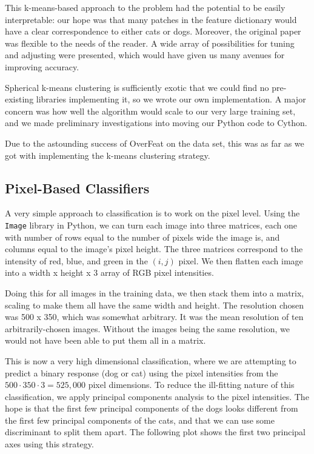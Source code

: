 \documentclass[12pt]{article}
\begin{document}
This k-means-based approach to the problem had the potential to be easily interpretable: our hope was that many patches in the feature dictionary would have a clear correspondence to either cats or dogs. Moreover, the original paper was flexible to the needs of the reader. A wide array of possibilities for tuning and adjusting were presented, which would have given us many avenues for improving accuracy.

Spherical k-means clustering is sufficiently exotic that we could find no pre-existing libraries implementing it, so we wrote our own implementation. A major concern was how well the algorithm would scale to our very large training set, and we made preliminary investigations into moving our
Python code to Cython.

Due to the astounding success of OverFeat on the data set, this was as far as we got with implementing the k-means clustering strategy.

\subsection{Pixel-Based Classifiers}
A very simple approach to classification is to work on the pixel level. Using the \verb+Image+ library in Python, we can turn each image into three matrices, each one with number of rows equal to the number of pixels wide the image is, and columns equal to the image's pixel height. The three matrices correspond to the intensity of red, blue, and green in the $(i,j)$ pixel. We then flatten each image into a width x height x 3 array of RGB pixel intensities. 

Doing this for all images in the training data, we then stack them into a matrix, scaling to make them all have the same width and height. The resolution chosen was 500 x 350, which was somewhat arbitrary. It was the mean resolution of ten arbitrarily-chosen images. Without the images being the same resolution, we would not have been able to put them all in a matrix.

This is now a very high dimensional classification, where we are attempting to predict a binary response (dog or cat) using the pixel intensities from the $500 \cdot 350 \cdot 3 = 525,000$ pixel dimensions. To reduce the ill-fitting nature of this classification, we apply principal components analysis to the pixel intensities. The hope is that the first few principal components of the dogs looks different from the first few principal components of the cats, and that we can use some discriminant to split them apart. The following plot shows the first two principal axes using this strategy.
\end{document}
